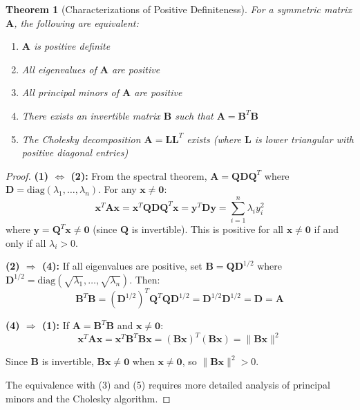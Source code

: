 \documentclass[12pt]{article}
\numberwithin{equation}{section}
\newcommand{\vect}[1]{\boldsymbol{#1}}   %
\newcommand{\mat}[1]{\mathbf{#1}}        %
\theoremstyle{plain}
\newtheorem{theorem}{Theorem}[section]
\theoremstyle{definition}
\theoremstyle{remark}
\begin{document}
\begin{theorem}[Characterizations of Positive Definiteness]
For a symmetric matrix $\mat{A}$, the following are equivalent:
\begin{enumerate}
\item $\mat{A}$ is positive definite
\item All eigenvalues of $\mat{A}$ are positive
\item All principal minors of $\mat{A}$ are positive
\item There exists an invertible matrix $\mat{B}$ such that $\mat{A} = \mat{B}^T\mat{B}$
\item The Cholesky decomposition $\mat{A} = \mat{L}\mat{L}^T$ exists (where $\mat{L}$ is lower triangular with positive diagonal entries)
\end{enumerate}
\end{theorem}

\begin{proof}
\textbf{(1) $\Leftrightarrow$ (2):} From the spectral theorem, $\mat{A} = \mat{Q}\mat{D}\mat{Q}^T$ where $\mat{D} = \text{diag}(\lambda_1, \ldots, \lambda_n)$. For any $\vect{x} \neq \vect{0}$:
$$\vect{x}^T\mat{A}\vect{x} = \vect{x}^T\mat{Q}\mat{D}\mat{Q}^T\vect{x} = \vect{y}^T\mat{D}\vect{y} = \sum_{i=1}^n \lambda_i y_i^2$$
where $\vect{y} = \mat{Q}^T\vect{x} \neq \vect{0}$ (since $\mat{Q}$ is invertible). This is positive for all $\vect{x} \neq \vect{0}$ if and only if all $\lambda_i > 0$.

\textbf{(2) $\Rightarrow$ (4):} If all eigenvalues are positive, set $\mat{B} = \mat{Q}\mat{D}^{1/2}$ where $\mat{D}^{1/2} = \text{diag}(\sqrt{\lambda_1}, \ldots, \sqrt{\lambda_n})$. Then:
$$\mat{B}^T\mat{B} = (\mat{D}^{1/2})^T\mat{Q}^T\mat{Q}\mat{D}^{1/2} = \mat{D}^{1/2}\mat{D}^{1/2} = \mat{D} = \mat{A}$$

\textbf{(4) $\Rightarrow$ (1):} If $\mat{A} = \mat{B}^T\mat{B}$ and $\vect{x} \neq \vect{0}$:
$$\vect{x}^T\mat{A}\vect{x} = \vect{x}^T\mat{B}^T\mat{B}\vect{x} = (\mat{B}\vect{x})^T(\mat{B}\vect{x}) = \|\mat{B}\vect{x}\|^2$$

Since $\mat{B}$ is invertible, $\mat{B}\vect{x} \neq \vect{0}$ when $\vect{x} \neq \vect{0}$, so $\|\mat{B}\vect{x}\|^2 > 0$.

The equivalence with (3) and (5) requires more detailed analysis of principal minors and the Cholesky algorithm.
\end{proof}
\end{document}
